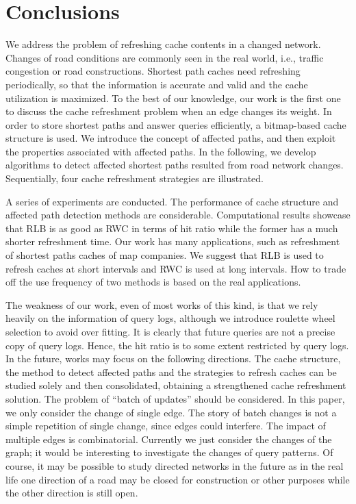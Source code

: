 \section{Conclusions}
\label{sec:con}
We address the problem of refreshing cache contents in a changed network.
Changes of road conditions are commonly seen in the real world, i.e., traffic congestion or road constructions.
Shortest path caches need refreshing periodically, so that the information is accurate and valid and the cache utilization is maximized.
To the best of our knowledge, our work is the first one to discuss the cache refreshment problem when an edge changes its weight.
In order to store shortest paths and answer queries efficiently, a bitmap-based cache structure is used.
We introduce the concept of affected paths, and then exploit the properties associated with affected paths.
In the following, we develop algorithms to detect affected shortest paths resulted from road network changes.
Sequentially, four cache refreshment strategies are illustrated.

A series of experiments are conducted. The performance of cache structure and affected path detection methods are considerable.
Computational results showcase that RLB is as good as RWC in terms of hit ratio while the former has a much shorter refreshment time.
Our work has many applications, such as refreshment of shortest paths caches of map companies.
We suggest that RLB is used to refresh caches at short intervals and RWC is used at long intervals. How to trade off the use frequency of two methods is based on the real applications.

The weakness of our work, even of most works of this kind, is that we rely heavily on the information of query logs, although we introduce roulette wheel selection to avoid over fitting.
It is clearly that future queries are not a precise copy of query logs. Hence, the hit ratio is to some extent restricted by query logs.
In the future, works may focus on the following directions. The cache structure, the method to detect affected paths and the strategies to refresh caches can be studied solely and then consolidated, obtaining a strengthened cache refreshment solution. The problem of ``batch of updates'' should be considered. In this paper, we only consider the change of single edge. The story of batch changes is not a simple repetition of single change, since edges could interfere. The impact of multiple edges is combinatorial.
Currently we just consider the changes of the graph; it would be interesting to investigate the changes of query patterns. Of course, it may be possible to study directed networks in the future as in the real life one direction of a road may be closed for construction or other purposes while the other direction is still open.

